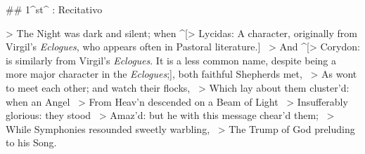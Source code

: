 ## 1^st^ \mvmt: Recitativo


> The Night was dark and silent; when ^[> Lycidas: A character, originally from Virgil's \textit{Eclogues}, who appears often in Pastoral literature.] \
> And ^[> Corydon: is similarly from Virgil's \textit{Eclogues}. It is a less common name, despite being a more major character in the \textit{Eclogues};], both faithful Shepherds met,  \
> As wont to meet each other; and watch their flocks,  \
> Which lay about them cluster’d: when an Angel  \
> From Heav’n descended on a Beam of Light  \
> Insufferably glorious: they stood  \
> Amaz’d: but he with this message chear’d them;  \
> While Symphonies resounded sweetly warbling,  \
> The Trump of God preluding to his Song.

